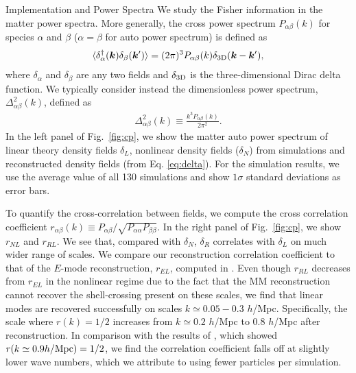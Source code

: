 \begin{section}{Implementation and Power Spectra}
 We study the Fisher information in the matter power
 spectra. More generally,
 the cross power spectrum $P_{\alpha\beta}(k)$ for species $\alpha$ and $\beta$
 ($\alpha=\beta$ for auto power spectrum) is defined as
 \begin{align}
   \langle \delta_\alpha^\dagger(\bm{k})\delta_\beta(\bm{k}') \rangle =
   (2\pi)^3 P_{\alpha\beta}(k) \delta_{\rm {3D}}(\bm{k}-\bm{k}'),
 \end{align}
 where $\delta_{\alpha}$ and $\delta_{\beta}$ are any two fields and
 $\delta_{\rm{3D}}$ is the three-dimensional Dirac delta function. We typically consider instead
 the dimensionless power spectrum, $\Delta_{\alpha\beta}^2(k)$, defined as
 \begin{align}
   \Delta_{\alpha\beta}^2(k) \equiv \frac{k^3 P_{\alpha\beta}(k)}{2\pi ^2}.
 \end{align}
 In the left panel of Fig.~\ref{fig:cp}, we show the matter auto power
 spectrum of linear theory density fields $\delta_L$, nonlinear density
 fields ($\delta_N$) from simulations and reconstructed density fields
 (from Eq. \ref{eq:delta}).  For the simulation
 results, we use the average value of all 130 simulations and show
 $1\sigma$ standard deviations as error bars.  

 To quantify the cross-correlation
 between fields, we compute the cross correlation coefficient
 $r_{\alpha\beta}(k)\equiv P_{\alpha\beta}/\sqrt{P_{\alpha\alpha}P_{\beta\beta}}$.  In the right panel of
 Fig.~\ref{fig:cp}, we show $r_{NL}$ and $r_{RL}$.  We see that, compared with $\delta_N$,
 $\delta_R$ correlates with $\delta_L$ on much wider range of scales.
 We compare our reconstruction correlation coefficient to that of the $E$-mode 
 reconstruction, $r_{EL}$, 
 computed in \citet{bib:Yu2016}.
 Even though $r_{RL}$ decreases from $r_{EL}$ in the nonlinear regime due to the fact that the MM reconstruction 
 cannot recover the shell-crossing present on these scales, we find that linear
 modes are recovered successfully on scales $k\simeq 0.05 - 0.3$ $h$/Mpc.
 Specifically, the scale where $r(k)=1/2$ increases from $k\simeq 0.2$ $h$/Mpc to
 $0.8$ $h$/Mpc after reconstruction.  In comparison with the results of \citet{bib:ZhuH2016},
 which showed $r(k\simeq0.9 h/\rm{Mpc})=1/2$, we find the correlation coefficient falls off at slightly lower
 wave numbers, which we attribute to using fewer particles per simulation.


\end{section}
